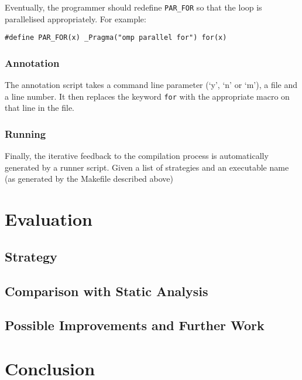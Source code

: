 \documentclass[journal]{IEEEtran}
\begin{document}
Eventually, the programmer should redefine \texttt{PAR\_FOR} so that the loop is
parallelised appropriately. For example:

\begin{lstlisting}
#define PAR_FOR(x) _Pragma("omp parallel for") for(x)
\end{lstlisting}

\subsubsection{Annotation}

The annotation script takes a command line parameter (`y', `n' or `m'), a file
and a line number. It then replaces the keyword \texttt{for} with the
appropriate macro on that line in the file.

\subsubsection{Running}

Finally, the iterative feedback to the compilation process is automatically
generated by a runner script. Given a list of strategies and an executable name
(as generated by the Makefile described above)

\section{Evaluation} \label{sec:eval}

\subsection{Strategy}

\subsection{Comparison with Static Analysis} \label{ssec:compare}

\subsection{Possible Improvements and Further Work}

\section{Conclusion}

\ifCLASSOPTIONcaptionsoff
  \newpage
\fi

\printbibliography
\end{document}
